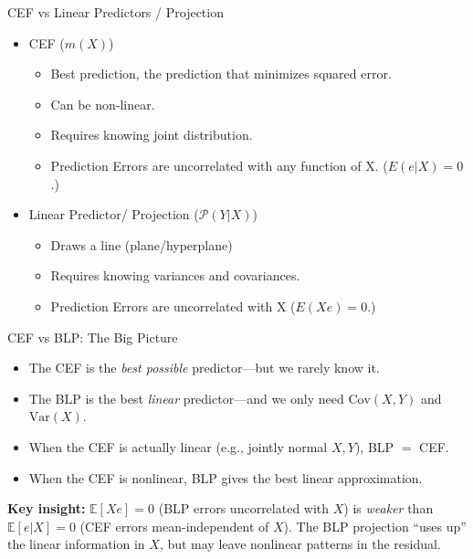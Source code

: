 \documentclass[aspectratio=169, handout, t]{beamer}
\numberwithin{equation}{section}
\begin{document}
\begin{frame}{CEF vs Linear Predictors / Projection}
\begin{itemize}
\item CEF ($m(X)$)
\begin{itemize}
\item Best prediction, the prediction that minimizes squared error.
\item Can be non-linear.
\item Requires knowing joint distribution.
\item Prediction Errors are uncorrelated with any function of X. ($E(e|X)=0$.)
\end{itemize}

\item Linear Predictor/ Projection ($\mathcal{P}(Y|X)$)
\begin{itemize}
\item Draws a line (plane/hyperplane)
\item Requires knowing variances and covariances.
\item Prediction Errors are uncorrelated with X ($E(Xe)=0$.)
\end{itemize}
\end{itemize}
\end{frame}


\begin{frame}{CEF vs BLP: The Big Picture}
\begin{tcolorbox}[colback=blue!5, colframe=blue!50, title=Why Settle for Linear?]
\begin{itemize}
\item The CEF is the \emph{best possible} predictor---but we rarely know it.
\item The BLP is the best \emph{linear} predictor---and we only need $\text{Cov}(X,Y)$ and $\text{Var}(X)$.
\item When the CEF is actually linear (e.g., jointly normal $X,Y$), BLP $=$ CEF.
\item When the CEF is nonlinear, BLP gives the best linear approximation.
\end{itemize}
\end{tcolorbox}
\medskip\pause
\textbf{Key insight:}  $\mathbb{E}[Xe]=0$ (BLP errors uncorrelated with $X$) is \emph{weaker} than $\mathbb{E}[e|X]=0$ (CEF errors mean-independent of $X$).  The BLP projection ``uses up'' the linear information in $X$, but may leave nonlinear patterns in the residual.
\end{frame}
\end{document}
